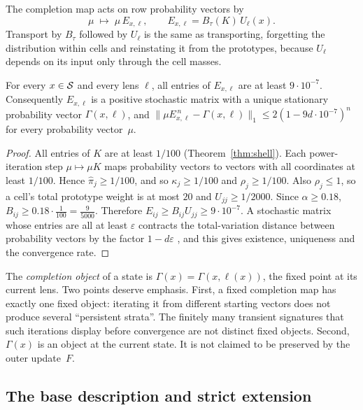 \medskip
\noindent The completion map acts on row probability vectors by
\[
\mu\;\longmapsto\;\mu\,E_{x,\ell},\qquad E_{x,\ell}=B_\tau(K)\,U_\ell(x).
\]
Transport by $B_\tau$ followed by $U_\ell$ is the same as transporting, forgetting the distribution within cells and reinstating it from the prototypes, because $U_\ell$ depends on its input only through the cell masses.

\begin{lemma}\label{lem:completion-object}
For every $x\in\mathcal{S}$ and every lens $\ell$, all entries of $E_{x,\ell}$ are at least $9\cdot10^{-7}$. Consequently $E_{x,\ell}$ is a positive stochastic matrix with a unique stationary probability vector $\Gamma(x,\ell)$, and $\lVert\mu E_{x,\ell}^{\,n}-\Gamma(x,\ell)\rVert_1\le2(1-9d\cdot10^{-7})^n$ for every probability vector~$\mu$.
\end{lemma}

\begin{proof}
All entries of $K$ are at least $1/100$ (Theorem~\ref{thm:shell}). Each power-iteration step $\mu\mapsto\mu K$ maps probability vectors to vectors with all coordinates at least $1/100$. Hence $\hat\pi_j\ge1/100$, and so $\kappa_j\ge1/100$ and $\rho_j\ge1/100$. Also $\rho_j\le1$, so a cell's total prototype weight is at most $20$ and $U_{jj}\ge1/2000$. Since $\alpha\ge0.18$, $B_{ij}\ge0.18\cdot\frac1{100}=\frac{9}{5000}$. Therefore $E_{ij}\ge B_{ij}U_{jj}\ge9\cdot10^{-7}$. A stochastic matrix whose entries are all at least $\varepsilon$ contracts the total-variation distance between probability vectors by the factor $1-d\varepsilon$ \cite{Seneta2006NonnegativeMatrices}, and this gives existence, uniqueness and the convergence rate.
\end{proof}

The \emph{completion object} of a state is $\Gamma(x)=\Gamma(x,\ell(x))$, the fixed point at its current lens. Two points deserve emphasis. First, a fixed completion map has exactly one fixed object: iterating it from different starting vectors does not produce several ``persistent strata''. The finitely many transient signatures that such iterations display before convergence are not distinct fixed objects. Second, $\Gamma(x)$ is an object at the current state. It is not claimed to be preserved by the outer update~$F$.

\subsection{The base description and strict extension}

